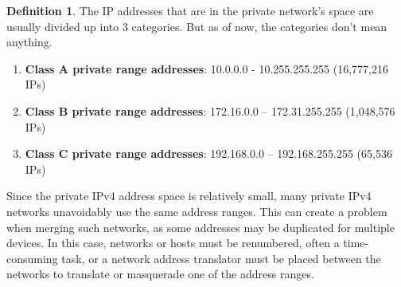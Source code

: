\documentclass[a4paper, 12pt]{report}
\theoremstyle{remark}
\theoremstyle{definition}
\newtheorem{definition}{Definition}[section]
\begin{document}
\begin{definition}
The IP addresses that are in the private network's space are usually divided up into 3 categories. But as of now, the categories don't mean anything. 
\begin{enumerate}
    \item \textbf{Class A private range addresses}: 10.0.0.0 - 10.255.255.255 (16,777,216 IPs)
    \item \textbf{Class B private range addresses}: 172.16.0.0 – 172.31.255.255 (1,048,576 IPs)
    \item \textbf{Class C private range addresses}: 192.168.0.0 – 192.168.255.255 (65,536 IPs)
\end{enumerate}
Since the private IPv4 address space is relatively small, many private IPv4 networks unavoidably use the same address ranges. This can create a problem when merging such networks, as some addresses may be duplicated for multiple devices. In this case, networks or hosts must be renumbered, often a time-consuming task, or a network address translator must be placed between the networks to translate or masquerade one of the address ranges. 
\end{definition}
\end{document}
